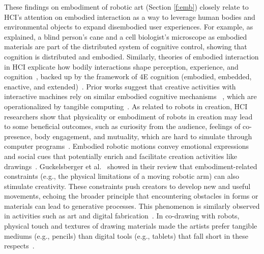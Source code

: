 These findings on embodiment of robotic art (Section \ref{f:emb}) closely relate to HCI's attention on embodied interaction as a way to leverage human bodies and environmental objects to expand disembodied user experiences. 
For example, as~\citet{hollan2000distributed} explained, a blind person's cane and a cell biologist's microscope as embodied materials are part of the distributed system of cognitive control, showing that cognition is distributed and embodied. 
Similarly, theories of embodied interaction in HCI explicate how bodily interactions shape perception, experience, and cognition~\cite{marshall2013introduction, antle2011workshop, antle2009body}, backed up by the framework of 4E cognition (embodied, embedded, enactive, and extended)~\cite{wheeler2005reconstructing, newen20184E}. 
Prior works suggest that creative activities with interactive machines rely on similar embodied cognitive mechanisms ~\cite{guckelsberger2021embodiment, malinin2019radical}, which are operationalized by tangible computing~\cite{hornecker2011role}. 
As related to robots in creation, HCI researchers show that physicality or embodiment of robots in creation may lead to some beneficial outcomes, such as curiosity from the audience, feelings of co-presence, body engagement, and mutuality, which are hard to simulate through computer programs~\cite{dell2022ah, hoggenmueller2020woodie}. Embodied robotic motions convey emotional expressions and social cues that potentially enrich and facilitate creation activities like drawings~\cite{ariccia2022make, grinberg2023implicit, dietz2017human, santos2021motions}. Guckelsberger et al.~\cite{guckelsberger2021embodiment} showed in their review that embodiment-related constraints (e.g., the physical limitations of a moving robotic arm) can also stimulate creativity. These constraints push creators to develop new and useful movements, echoing the broader principle that encountering obstacles in forms or materials can lead to generative processes. This phenomenon is similarly observed in activities such as art and digital fabrication~\cite{devendorf2015being, hirsch2023nothing}. In co-drawing with robots, physical touch and textures of drawing materials made the artists prefer tangible mediums (e.g., pencils) than digital tools (e.g., tablets) that fall short in these respects~\cite{jansen2021exploring}.

